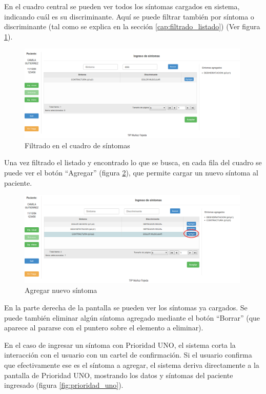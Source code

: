 En el cuadro central se pueden ver todos los síntomas cargados en sistema, indicando cuál es su discriminante. Aquí se puede filtrar también por síntoma o discriminante (tal como se explica en la sección \ref{cap:filtrado_listado}) (Ver figura \ref{fig:sintomas_filtrar}).
\begin{figure}
\centerline{\includegraphics[width=0.99\textwidth]{sintomas_buscar.png}}
\caption{Filtrado en el cuadro de síntomas} \label{fig:sintomas_filtrar}
\end{figure}
Una vez filtrado el listado y encontrado lo que se busca, en cada fila del cuadro se puede ver el botón ``Agregar'' (figura \ref{fig:sintomas_agregar}), que permite cargar un nuevo síntoma al paciente.
\begin{figure}
\centerline{\includegraphics[width=0.99\textwidth]{sintomas_agregar.png}}
\caption{Agregar nuevo síntoma} \label{fig:sintomas_agregar}
\end{figure}
En la parte derecha de la pantalla se pueden ver los síntomas ya cargados. Se puede también eliminar algún síntoma agregado mediante el botón ``Borrar'' (que aparece al pararse con el puntero sobre el elemento a eliminar).

En el caso de ingresar un síntoma con Prioridad UNO,  el sistema corta la interacción con el usuario con un cartel de confirmación. Si el usuario confirma que efectivamente ese es el síntoma a agregar, el sistema deriva directamente a la pantalla de Prioridad UNO, mostrando los datos y síntomas del paciente ingresado (figura \ref{fig:prioridad_uno}).

